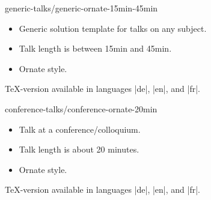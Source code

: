 \begin{solution}{generic-talks/generic-ornate-15min-45min}
  \begin{itemize}
  \item
    Generic solution template for talks on any subject.
  \item
    Talk length is between 15min and 45min.
  \item
    Ornate style.
  \end{itemize}

  \beamernote
  \TeX-version available in languages |de|, |en|, and |fr|.

\end{solution}

\begin{solution}{conference-talks/conference-ornate-20min}
  \begin{itemize}
  \item
    Talk at a conference/colloquium.
  \item
    Talk length is about 20 minutes.
  \item
    Ornate style.
  \end{itemize}

  \beamernote
  \TeX-version available in languages |de|, |en|, and |fr|.

\end{solution}
